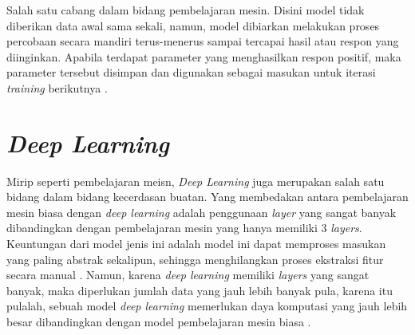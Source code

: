 Salah satu cabang dalam bidang pembelajaran mesin. Disini model tidak diberikan data awal sama sekali, namun, model dibiarkan melakukan proses percobaan secara mandiri terus-menerus sampai tercapai hasil atau respon yang diinginkan. Apabila terdapat parameter yang menghasilkan respon positif, maka parameter tersebut disimpan dan digunakan sebagai masukan untuk iterasi \textit{training} berikutnya \cite{mit_ml_expl}.

\section{\textit{Deep Learning}}

Mirip seperti pembelajaran meisn, \textit{Deep Learning} juga merupakan salah satu bidang dalam bidang kecerdasan buatan. Yang membedakan antara pembelajaran mesin biasa dengan \textit{deep learning} adalah penggunaan \textit{layer} yang sangat banyak dibandingkan dengan pembelajaran mesin yang hanya memiliki 3 \textit{layers}. Keuntungan dari model jenis ini adalah model ini dapat memproses masukan yang paling abstrak sekalipun, sehingga menghilangkan proses ekstraksi fitur secara manual \cite{mathwork_deeplearning}. Namun, karena \textit{deep learning} memiliki \textit{layers} yang sangat banyak, maka diperlukan jumlah data yang jauh lebih banyak pula, karena itu pulalah, sebuah model \textit{deep learning} memerlukan daya komputasi yang jauh lebih besar dibandingkan dengan model pembelajaran mesin biasa \cite{mit_ml_expl}.
